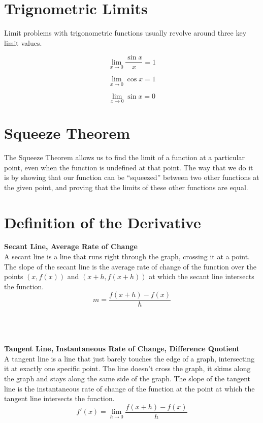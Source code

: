 \section{Trignometric Limits}

Limit problems with trigonometric functions usually revolve around three key 
limit values.

\begin{equation*}
  \lim_{x \to 0} \frac{\sin x}{x} = 1
\end{equation*}

\begin{equation*}
  \lim_{x \to 0} \cos x = 1
\end{equation*}

\begin{equation*}
  \lim_{x \to 0} \sin x = 0
\end{equation*}


\section{Squeeze Theorem}
The Squeeze Theorem allows us to find the limit of a function at a particular 
point, even when the function is undefined at that point. The way that we do it 
is by showing that our function can be “squeezed” between two other functions at 
the given point, and proving that the limits of these other functions are equal.


\section{Definition of the Derivative}

\noindent \textbf{Secant Line, Average Rate of Change}\\
A secant line is a line that runs right through the graph, crossing it at a 
point. The slope of the secant line is the average rate of change of the 
function over the points $(x, f(x))$ and $(x+h,f(x+h))$ at which the secant line
intersects the function.\\
\begin{equation*}
  m = \frac{f(x+h)-f(x)}{h}
\end{equation*}

\noindent \\\\\\\textbf{Tangent Line, Instantaneous Rate of Change, Difference 
                  Quotient}\\
A tangent line is a line that just barely touches the edge of a graph, 
intersecting it at exactly one specific point. The line doesn't cross the graph, 
it skims along the graph and stays along the same side of the graph. The slope 
of the tangent line is the instantaneous rate of change of the function at the 
point at which the tangent line intersects the function.\\
\begin{equation*}
  f'(x)=\lim_{h \to 0} \frac{f(x+h)-f(x)}{h}
\end{equation*}


